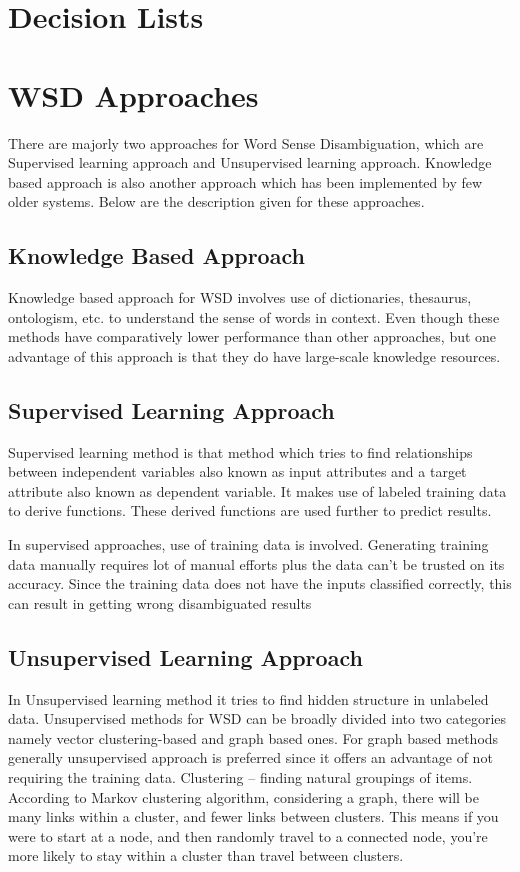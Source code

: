\documentclass[article,dr=phil,type=drfinal,colorback,accentcolor=tud9c]{tudthesis}
\begin{document}
\section{Decision Lists}

\newpage
\section{WSD Approaches}
There are majorly two approaches for Word Sense Disambiguation, which
are Supervised learning approach and Unsupervised learning approach.
Knowledge based approach is also another approach which has been implemented
by few older systems. Below are the description given for these approaches.
\subsection{Knowledge Based Approach}
Knowledge based approach for WSD involves use of dictionaries,
thesaurus, ontologism, etc. to understand the sense of words in context. Even
though these methods have comparatively lower performance than other
approaches, but one advantage of this approach is that they do have large-scale
knowledge resources.

\subsection{Supervised Learning Approach}
Supervised learning method is that method which tries to find relationships
between independent variables also known as input attributes and a target
attribute also known as dependent variable. It makes use of labeled training data
to derive functions. These derived functions are used further to predict results.

In supervised approaches, use of training data is involved.
Generating training data manually requires lot of manual efforts plus the data
can’t be trusted on its accuracy. Since the training data does not have the inputs
classified correctly, this can result in getting wrong disambiguated results

\subsection{Unsupervised Learning Approach}
In Unsupervised learning method it tries to find hidden structure in
unlabeled data. Unsupervised methods for WSD can be broadly divided into two
categories namely vector clustering-based and graph based ones. For graph based
methods generally unsupervised approach is preferred since it offers an
advantage of not requiring the training data.
Clustering – finding natural groupings of items. According to Markov clustering algorithm, considering a graph, there will be many links within a cluster, and fewer links between clusters. This means if you were to start at a node, and then randomly travel to a connected node, you’re more likely to stay within a cluster than travel between clusters.
\end{document}
